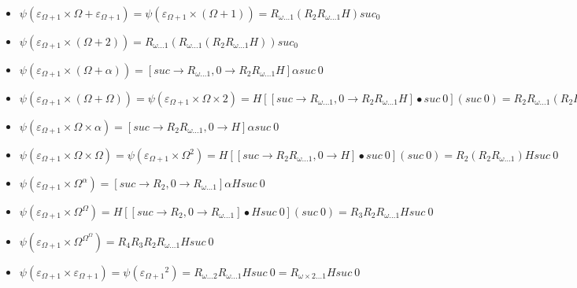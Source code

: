 \documentclass[10pt]{article}
\begin{document}
\begin{itemize}
\item \( \psi(\varepsilon_{\Omega+1} \times \Omega+\varepsilon_{\Omega+1}) = \psi(\varepsilon_{\Omega+1} \times (\Omega+1)) = R_{\omega \ldots 1} (R_2 R_{\omega \ldots 1} H) suc_ 0 \)

\item \( \psi(\varepsilon_{\Omega+1} \times (\Omega+2)) = R_{\omega \ldots 1} (R_{\omega \ldots 1} (R_2 R_{\omega \ldots 1} H)) suc_ 0 \)

\item \( \psi(\varepsilon_{\Omega+1} \times (\Omega+\alpha)) = [suc \rightarrow R_{\omega \ldots 1}, 0 \rightarrow R_2 R_{\omega \ldots 1} H] \alpha suc\ 0 \)

\item \( \psi(\varepsilon_{\Omega+1} \times (\Omega+\Omega)) = \psi(\varepsilon_{\Omega+1} \times \Omega \times 2) = H [[suc \rightarrow R_{\omega \ldots 1}, 0 \rightarrow R_2 R_{\omega \ldots 1} H] \bullet suc\ 0] (suc\ 0) = R_2 R_{\omega \ldots 1} (R_2 R_{\omega \ldots 1} H) suc\ 0 \)

\item \( \psi(\varepsilon_{\Omega+1} \times \Omega \times \alpha) = [suc \rightarrow R_2 R_{\omega \ldots 1}, 0 \rightarrow  H] \alpha suc\ 0 \)

\item \( \psi(\varepsilon_{\Omega+1} \times \Omega \times \Omega) = \psi(\varepsilon_{\Omega+1} \times \Omega^2) = H [[suc \rightarrow R_2 R_{\omega \ldots 1}, 0 \rightarrow  H] \bullet suc\ 0] (suc\ 0) = R_2 (R_2 R_{\omega \ldots 1}) H suc\ 0 \)

\item \( \psi(\varepsilon_{\Omega+1} \times \Omega^\alpha) = [suc \rightarrow R_2, 0 \rightarrow R_{\omega \ldots 1}] \alpha H suc\ 0 \)

\item \( \psi(\varepsilon_{\Omega+1} \times \Omega^\Omega) = H [[suc \rightarrow R_2, 0 \rightarrow R_{\omega \ldots 1}] \bullet H suc\ 0] (suc\ 0) = R_3 R_2 R_{\omega \ldots 1} H suc\ 0 \)

\item \( \psi(\varepsilon_{\Omega+1} \times \Omega^{\Omega^\Omega}) = R_4 R_3 R_2 R_{\omega \ldots 1} H suc\ 0 \)

\item \( \psi(\varepsilon_{\Omega+1} \times \varepsilon_{\Omega+1}) = \psi({\varepsilon_{\Omega+1}}^2) = R_{\omega \ldots 2}  R_{\omega \ldots 1} H suc\ 0 = R_{\omega \times 2 \ldots 1} H suc\ 0 \)


\end{itemize}
\end{document}
